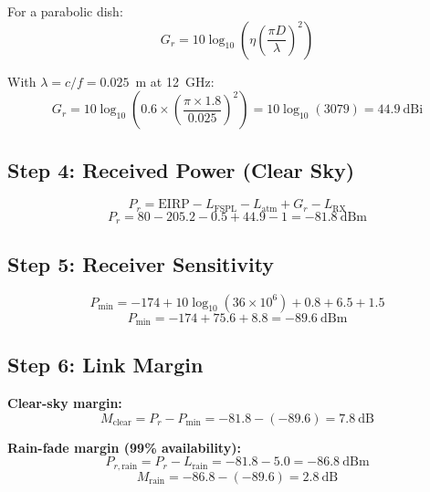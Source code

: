 For a parabolic dish:
\begin{equation}
G_r = 10\log_{10}\left(\eta \left(\frac{\pi D}{\lambda}\right)^2\right)
\end{equation}

With $\lambda = c/f = 0.025$~m at 12~GHz:
\begin{equation}
G_r = 10\log_{10}\left(0.6 \times \left(\frac{\pi \times 1.8}{0.025}\right)^2\right) = 10\log_{10}(3079) = 44.9~\text{dBi}
\end{equation}

\subsection*{Step 4: Received Power (Clear Sky)}

\begin{equation}
P_r = \text{EIRP} - L_{\text{FSPL}} - L_{\text{atm}} + G_r - L_{\text{RX}}
\end{equation}
\begin{equation}
P_r = 80 - 205.2 - 0.5 + 44.9 - 1 = -81.8~\text{dBm}
\end{equation}

\subsection*{Step 5: Receiver Sensitivity}

\begin{equation}
P_{\text{min}} = -174 + 10\log_{10}(36 \times 10^6) + 0.8 + 6.5 + 1.5
\end{equation}
\begin{equation}
P_{\text{min}} = -174 + 75.6 + 8.8 = -89.6~\text{dBm}
\end{equation}

\subsection*{Step 6: Link Margin}

\textbf{Clear-sky margin:}
\begin{equation}
M_{\text{clear}} = P_r - P_{\text{min}} = -81.8 - (-89.6) = 7.8~\text{dB}
\end{equation}

\textbf{Rain-fade margin (99\% availability):}
\begin{equation}
P_{r,\text{rain}} = P_r - L_{\text{rain}} = -81.8 - 5.0 = -86.8~\text{dBm}
\end{equation}
\begin{equation}
M_{\text{rain}} = -86.8 - (-89.6) = 2.8~\text{dB}
\end{equation}


